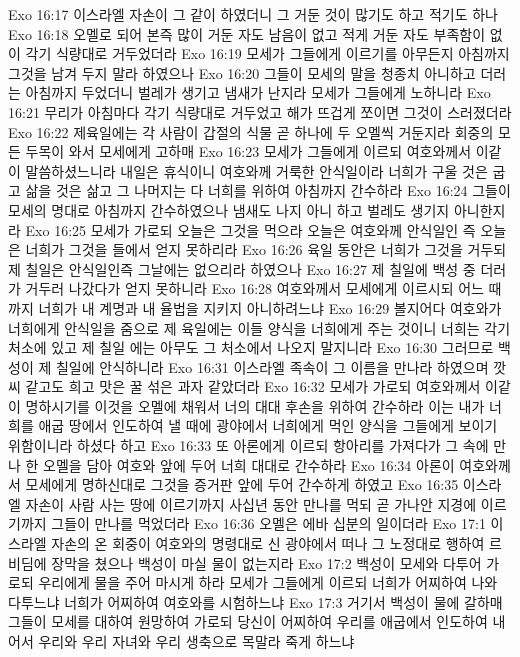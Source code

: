 Exo 16:17  이스라엘 자손이 그 같이 하였더니 그 거둔 것이 많기도 하고 적기도 하나
Exo 16:18  오멜로 되어 본즉 많이 거둔 자도 남음이 없고 적게 거둔 자도 부족함이 없이 각기 식량대로 거두었더라
Exo 16:19  모세가 그들에게 이르기를 아무든지 아침까지 그것을 남겨 두지 말라 하였으나
Exo 16:20  그들이 모세의 말을 청종치 아니하고 더러는 아침까지 두었더니 벌레가 생기고 냄새가 난지라 모세가 그들에게 노하니라
Exo 16:21  무리가 아침마다 각기 식량대로 거두었고 해가 뜨겁게 쪼이면 그것이 스러졌더라
Exo 16:22  제육일에는 각 사람이 갑절의 식물 곧 하나에 두 오멜씩 거둔지라 회중의 모든 두목이 와서 모세에게 고하매
Exo 16:23  모세가 그들에게 이르되 여호와께서 이같이 말씀하셨느니라 내일은 휴식이니 여호와께 거룩한 안식일이라 너희가 구울 것은 굽고 삶을 것은 삶고 그 나머지는 다 너희를 위하여 아침까지 간수하라
Exo 16:24  그들이 모세의 명대로 아침까지 간수하였으나 냄새도 나지 아니 하고 벌레도 생기지 아니한지라
Exo 16:25  모세가 가로되 오늘은 그것을 먹으라 오늘은 여호와께 안식일인 즉 오늘은 너희가 그것을 들에서 얻지 못하리라
Exo 16:26  육일 동안은 너희가 그것을 거두되 제 칠일은 안식일인즉 그날에는 없으리라 하였으나
Exo 16:27  제 칠일에 백성 중 더러가 거두러 나갔다가 얻지 못하니라
Exo 16:28  여호와께서 모세에게 이르시되 어느 때까지 너희가 내 계명과 내 율법을 지키지 아니하려느냐
Exo 16:29  볼지어다 여호와가 너희에게 안식일을 줌으로 제 육일에는 이들 양식을 너희에게 주는 것이니 너희는 각기 처소에 있고 제 칠일 에는 아무도 그 처소에서 나오지 말지니라
Exo 16:30  그러므로 백성이 제 칠일에 안식하니라
Exo 16:31  이스라엘 족속이 그 이름을 만나라 하였으며 깟씨 같고도 희고 맛은 꿀 섞은 과자 같았더라
Exo 16:32  모세가 가로되 여호와께서 이같이 명하시기를 이것을 오멜에 채워서 너의 대대 후손을 위하여 간수하라 이는 내가 너희를 애굽 땅에서 인도하여 낼 때에 광야에서 너희에게 먹인 양식을 그들에게 보이기 위함이니라 하셨다 하고
Exo 16:33  또 아론에게 이르되 항아리를 가져다가 그 속에 만나 한 오멜을 담아 여호와 앞에 두어 너희 대대로 간수하라
Exo 16:34  아론이 여호와께서 모세에게 명하신대로 그것을 증거판 앞에 두어 간수하게 하였고
Exo 16:35  이스라엘 자손이 사람 사는 땅에 이르기까지 사십년 동안 만나를 먹되 곧 가나안 지경에 이르기까지 그들이 만나를 먹었더라
Exo 16:36  오멜은 에바 십분의 일이더라
Exo 17:1  이스라엘 자손의 온 회중이 여호와의 명령대로 신 광야에서 떠나 그 노정대로 행하여 르비딤에 장막을 쳤으나 백성이 마실 물이 없는지라
Exo 17:2  백성이 모세와 다투어 가로되 우리에게 물을 주어 마시게 하라 모세가 그들에게 이르되 너희가 어찌하여 나와 다투느냐 너희가 어찌하여 여호와를 시험하느냐
Exo 17:3  거기서 백성이 물에 갈하매 그들이 모세를 대하여 원망하여 가로되 당신이 어찌하여 우리를 애굽에서 인도하여 내어서 우리와 우리 자녀와 우리 생축으로 목말라 죽게 하느냐
